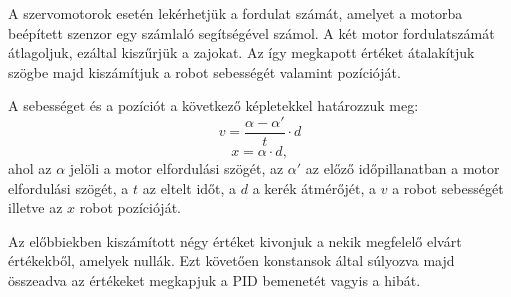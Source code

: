 A szervomotorok esetén lekérhetjük a fordulat számát, amelyet a motorba beépített szenzor egy számlaló segítségével számol. A két motor fordulatszámát átlagoljuk, ezáltal kiszűrjük a zajokat. Az így megkapott értéket átalakítjuk szögbe majd kiszámítjuk a robot sebességét valamint pozícióját.

A sebességet és a pozíciót a következő képletekkel határozzuk meg:
\begin{equation}
	v=\frac{\alpha-\alpha'}{t}\cdot d
\end{equation}
\begin{equation}
	x=\alpha\cdot d,
\end{equation}
ahol az $\alpha$ jelöli a motor elfordulási szögét, az $\alpha'$ az előző időpillanatban a motor elfordulási szögét, a $t$ az eltelt időt, a $d$ a kerék átmérőjét, a $v$ a robot sebességét illetve az $x$ robot pozícióját.

Az előbbiekben kiszámított négy értéket kivonjuk a nekik megfelelő elvárt értékekből, amelyek nullák. Ezt követően konstansok által súlyozva majd összeadva az értékeket megkapjuk a PID bemenetét vagyis a hibát.